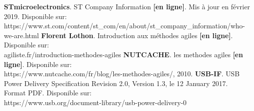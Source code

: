 \adjustmtc
\renewcommand\bibname{BIBLIOGRAPHIE}
\begin{thebibliography}{9}
\thispagestyle{MyStyle}
\textbf{STmicroelectronics}. ST Company Information \textbf{[en ligne]}. Mis à jour en février 2019. Disponible sur:\\ https://www.st.com/content/st\_com/en/about/st\_company\_information/who-we-are.html
\textbf{Florent Lothon}. Introduction aux méthodes agiles \textbf{[en ligne]}. Disponible sur:\\
agiliste.fr/introduction-methodes-agiles
\textbf{NUTCACHE}. les methodes agiles \textbf{[en ligne]}. Disponible sur:\\ https://www.nutcache.com/fr/blog/les-methodes-agiles/, 2010.
\textbf{USB-IF}. USB Power Delivery Specification Revision 2.0, Version 1.3, le 12 January 2017. Format PDF. Disponible sur:\\
https://www.usb.org/document-library/usb-power-delivery-0


\end{thebibliography} 

